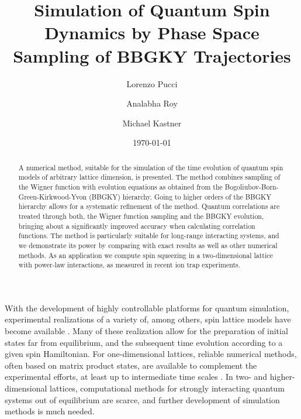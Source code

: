 \documentclass[aps,prl,showpacs,amsmath,amssymb,superscriptaddress,reprint,10pt]{revtex4-1}
\begin{document}
\title{Simulation of Quantum Spin Dynamics by Phase Space Sampling of BBGKY Trajectories}  

\author{Lorenzo Pucci} 

\author{Analabha Roy} 

\author{Michael Kastner} 

\date{\today}

\begin{abstract}
A numerical method, suitable for the simulation of the time evolution of quantum spin models of arbitrary lattice dimension, is presented. The method combines sampling of the Wigner function with evolution equations as obtained from the Bogoliubov-Born-Green-Kirkwood-Yvon (BBGKY) hierarchy. Going to higher orders of the BBGKY hierarchy allows for a systematic refinement of the method. Quantum correlations are treated through both, the Wigner function sampling and the BBGKY evolution, bringing about a significantly improved accuracy when calculating correlation functions. The method is particularly suitable for long-range interacting systems, and we demonstrate its power by comparing with exact results as well as other numerical methods. As an application we compute spin squeezing in a two-dimensional lattice with power-law interactions, as measured in recent ion trap experiments.
\end{abstract}


\maketitle 


With the development of highly controllable platforms for quantum simulation, experimental realizations of a variety of, among others, spin lattice models have become available \cite{Simon_etal11,*Struck_etal11,*Labuhn,Britton_etal12,Schauss_etal12,*Islam_etal13,*dePaz_etal13,*Yan_etal13,*Jurcevic_etal14,*Richerme_etal14}. Many of these realization allow for the preparation of initial states far from equilibrium, and the subsequent time evolution according to a given spin Hamiltonian. For one-dimensional lattices, reliable numerical methods, often based on matrix product states, are available to complement the experimental efforts, at least up to intermediate time scales \cite{Schollwoeck11}. In two- and higher-dimensional lattices, computational methods for strongly interacting quantum systems out of equilibrium are scarce, and further development of simulation methods is much needed.
\end{document}
